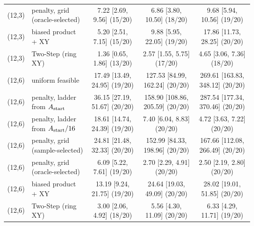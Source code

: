 \begin{table}[t]
{\begin{tabular}{llccc}
(12,3) & penalty, grid (oracle-selected) & 7.22 [2.69, 9.56] (15/20) & 6.86 [3.80, 10.50] (18/20) & 9.68 [5.94, 10.56] (19/20)\\
(12,3) & biased product + XY & 5.20 [2.51, 7.15] (15/20) & 9.88 [5.95, 22.05] (19/20) & 17.86 [11.73, 28.25] (20/20)\\
(12,3) & Two-Step (ring XY) & 1.36 [0.65, 1.86] (13/20) & 2.57 [1.55, 5.75] (17/20) & 4.65 [3.06, 7.36] (18/20)\\
\midrule
(12,6) & uniform feasible & 17.49 [13.49, 24.95] (19/20) & 127.53 [84.99, 162.24] (20/20) & 269.61 [163.83, 348.12] (20/20)\\
(12,6) & penalty, ladder from $A_{\rm start}$ & 36.15 [27.19, 51.67] (20/20) & 158.90 [108.86, 205.59] (20/20) & 287.54 [177.34, 370.46] (20/20)\\
(12,6) & penalty, ladder from $A_{\rm start}/16$ & 18.61 [14.74, 24.39] (19/20) & 7.40 [6.04, 8.83] (20/20) & 4.72 [3.63, 7.22] (20/20)\\
(12,6) & penalty, grid (sample-selected) & 24.81 [21.48, 32.33] (20/20) & 152.99 [84.33, 198.96] (20/20) & 167.66 [112.08, 266.49] (20/20)\\
(12,6) & penalty, grid (oracle-selected) & 6.09 [5.22, 7.61] (19/20) & 2.70 [2.29, 4.91] (20/20) & 2.50 [2.19, 2.80] (20/20)\\
(12,6) & biased product + XY & 13.19 [9.24, 21.75] (19/20) & 24.64 [19.03, 49.09] (20/20) & 28.02 [19.01, 51.85] (20/20)\\
(12,6) & Two-Step (ring XY) & 3.00 [2.06, 4.92] (18/20) & 5.56 [4.30, 11.09] (20/20) & 6.33 [4.29, 11.71] (19/20)\\
\bottomrule\end{tabular}}\end{table}
